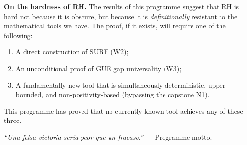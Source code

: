 \documentclass[11pt]{amsart}
\theoremstyle{definition}
\theoremstyle{remark}
\begin{document}
\medskip
\noindent\textbf{On the hardness of RH.}
The results of this programme suggest that RH is hard not because it is obscure, but
because it is \emph{definitionally} resistant to the mathematical tools we have.  The
proof, if it exists, will require one of the following:
\begin{enumerate}[label=\upshape(\alph*)]
  \item A direct construction of SURF (W2);
  \item An unconditional proof of GUE gap universality (W3);
  \item A fundamentally new tool that is simultaneously deterministic, upper-bounded,
    and non-positivity-based (bypassing the capstone N1).
\end{enumerate}
This programme has proved that no currently known tool achieves any of these three.

\medskip
\noindent\emph{``Una falsa victoria sería peor que un fracaso.''} --- Programme motto.
\end{document}
